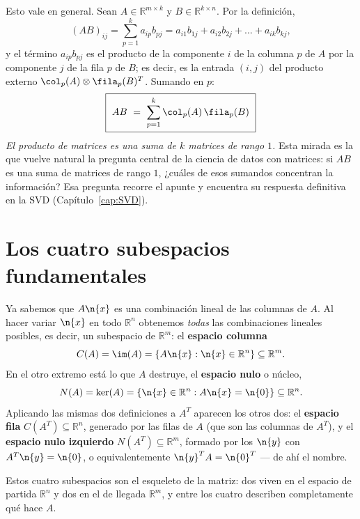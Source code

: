 Esto vale en general. Sean $A \in \mathbb{R}^{m \times k}$ y
$B \in \mathbb{R}^{k \times n}$. Por la definición,
\[
(AB)_{ij} = \sum_{p=1}^{k} a_{ip} b_{pj}
= a_{i1}b_{1j}+ a_{i2}b_{2j} + \dots + a_{ik}b_{kj},
\]
y el término $a_{ip}b_{pj}$ es el producto de la componente $i$ de la columna
$p$ de $A$ por la componente $j$ de la fila $p$ de $B$; es decir, es la entrada
$(i,j)$ del producto externo $\col_p(A)\otimes \fila_p(B)^T$. Sumando en $p$:
\begin{equation}
\boxed{\ AB \ =\ \sum_{p=1}^{k} \col_p(A)\, \fila_p(B) \ }
\label{eq:suma-rango1}
\end{equation}
\emph{El producto de matrices es una suma de $k$ matrices de rango $1$.} Esta
mirada es la que vuelve natural la pregunta central de la ciencia de datos con
matrices: si $AB$ es una suma de matrices de rango $1$, ¿cuáles de esos sumandos
concentran la información? Esa pregunta recorre el apunte y encuentra su
respuesta definitiva en la SVD (Capítulo~\ref{cap:SVD}).

\section{Los cuatro subespacios fundamentales}
\label{sec:cuatro}

Ya sabemos que $A\n{x}$ es una combinación lineal de las columnas de $A$. Al
hacer variar $\n{x}$ en todo $\mathbb{R}^n$ obtenemos \emph{todas} las
combinaciones lineales posibles, es decir, un subespacio de $\mathbb{R}^m$: el
\textbf{espacio columna}
\[
C(A) = \im(A) = \{A\n{x} : \n{x} \in \mathbb{R}^n\} \subseteq \mathbb{R}^m .
\]
En el otro extremo está lo que $A$ destruye, el \textbf{espacio nulo} o núcleo,
\[
N(A) = \ker(A) = \{\n{x} \in \mathbb{R}^n : A\n{x} = \n{0}\} \subseteq \mathbb{R}^n .
\]
Aplicando las mismas dos definiciones a $A^T$ aparecen los otros dos: el
\textbf{espacio fila} $C(A^T) \subseteq \mathbb{R}^n$, generado por las filas de
$A$ (que son las columnas de $A^T$), y el \textbf{espacio nulo izquierdo}
$N(A^T) \subseteq \mathbb{R}^m$, formado por los $\n{y}$ con $A^T\n{y} = \n{0}$,
o equivalentemente $\n{y}^T A = \n{0}^T$ --- de ahí el nombre.

Estos cuatro subespacios son el esqueleto de la matriz: dos viven en el espacio
de partida $\mathbb{R}^n$ y dos en el de llegada $\mathbb{R}^m$, y entre los
cuatro describen completamente qué hace $A$.

